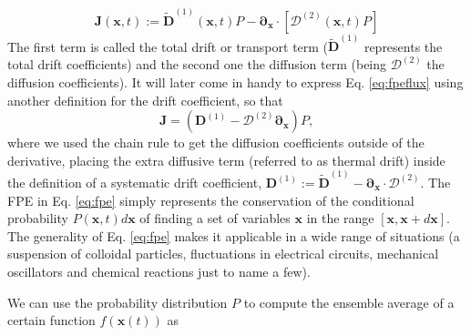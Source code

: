 \documentclass[twoside,openright,titlepage,numbers=noenddot,%
headinclude,footinclude,cleardoublepage=empty,abstract=on,
BCOR=5mm,fontsize=11pt, dvipsnames, paper=b5
]{scrreprt}
\renewcommand{\vec}[1]{\bm{#1}}
\newcommand{\tens}[1]{\bm{\mathcal{#1}}}
\begin{document}
\begin{equation}
  \label{eq:fpefluxkinetic}
    \vec{J}(\vec{x}, t) := \widetilde{\vec{D}}^{(1)}(\vec{x},t)P - \vec{\partial}_{\vec{x}}\cdot\left[\tens{D}^{(2)}(\vec{x}, t)  P\right]
\end{equation}
The first term is called the total drift or transport term ($\widetilde{\vec{D}}^{(1)}$ represents the total drift coefficients) and the second one the diffusion term (being $\tens{D}^{(2)}$ the diffusion coefficients). It will later come in handy to express Eq. \eqref{eq:fpeflux} using another definition for the drift coefficient, so that
\begin{equation}
  \label{eq:fpeflux}
  \vec{J} = \left(\vec{D}^{(1)} - \tens{D}^{(2)} \vec{\partial}_{\vec{x}}\right) P,
\end{equation}
where we used the chain rule to get the diffusion coefficients outside of the derivative, placing the extra diffusive term (referred to as thermal drift) inside the definition of a systematic drift coefficient, $\vec{D}^{(1)}:=\widetilde{\vec{D}}^{(1)}-\vec{\partial}_{\vec{x}}\cdot\tens{D}^{(2)}$.
%
The \gls{FPE} in Eq. \eqref{eq:fpe} simply represents the conservation of the conditional probability $P(\vec{x},t)d\vec{x}$ of finding a set of variables $\vec{x}$ in the range $[\vec{x}, \vec{x} + d\vec{x}]$. The generality of Eq. \eqref{eq:fpe} makes it applicable in a wide range of situations (a suspension of colloidal particles, fluctuations in electrical circuits, mechanical oscillators and chemical reactions just to name a few).

We can use the probability distribution $P$ to compute the ensemble average of a certain function $f(\vec{x}(t))$ as
\end{document}

